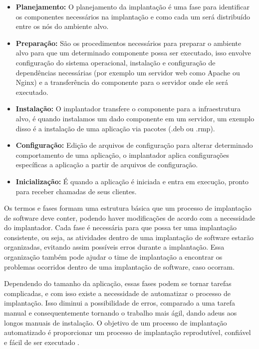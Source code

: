 \begin{itemize}
  \item  \textbf{Planejamento:} O planejamento da implantação é uma fase
  para identificar os componentes necessários na implantação e como cada um será
  distribuído entre os nós do ambiente alvo.
  \item  \textbf{Preparação:} São os procedimentos necessários para preparar o
  ambiente alvo para que um determinado componente possa ser executado, isso envolve
  configuração do sistema operacional, instalação e configuração de dependências
  necessárias (por exemplo um servidor web como Apache ou Nginx) e a transferência
  do componente para o servidor onde ele será executado.
  \item  \textbf{Instalação:} O implantador transfere o componente para a infraestrutura
  alvo, é quando instalamos um dado componente em um servidor, um exemplo disso
  é a instalação de uma aplicação via pacotes (.deb ou .rmp).
  \item  \textbf{Configuração:} Edição de arquivos de configuração para alterar
  determinado comportamento de uma aplicação, o implantador aplica configurações
  específicas a aplicação a partir de arquivos de configuração.
  \item  \textbf{Inicialização:} É quando a aplicação é iniciada e entra em execução,
  pronto para receber chamadas de seus clientes.
\end{itemize}

Os termos e fases formam uma estrutura básica que um processo de implantação de software
deve conter, podendo haver modificações de acordo com a necessidade do implantador. 
Cada fase é necessária para que possa ter uma implantação consistente, ou seja, as
atividades dentro de uma implantação de software estarão organizadas, evitando assim
possíveis erros durante a implantação. Essa organização também pode ajudar o
time de implantação a encontrar os problemas ocorridos dentro de uma implantação
de software, caso ocorram.

Dependendo do tamanho da aplicação, essas fases podem se tornar tarefas complicadas,
e com isso existe a necessidade de automatizar o processo de implantação. Isso 
diminui a possibilidade de erros, comparado a uma tarefa manual e consequentemente
tornando o trabalho mais ágil, dando adeus aos longos manuais de instalação. 
O objetivo de um processo de implantação automatizado é proporcionar um processo
 de implantação reprodutível, confiável e fácil de ser executado \cite{humble2010}.

